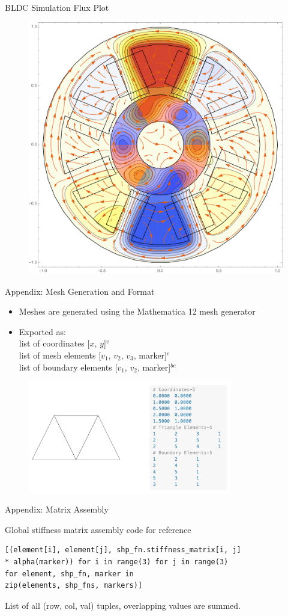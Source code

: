 \documentclass{beamer}
\begin{document}
    \begin{frame}{BLDC Simulation}
        Flux Plot
        \begin{figure}
            \includegraphics[width=.6\linewidth]{motor1.pdf}
        \end{figure}
    \end{frame}
    \begin{frame}{Appendix: Mesh Generation and Format}
        \begin{itemize}
            \item Meshes are generated using the Mathematica 12 mesh generator
            \item Exported as:\\ list of coordinates [$x$, $y$]$^v$ \\list of mesh elements [$v_1$, $v_2$, $v_3$, marker]$^{e}$ \\list of boundary elements [$v_1$, $v_2$, marker]$^{be}$
        \end{itemize}


        \begin{figure}
            \centering
            \includegraphics[width=3.5in]{meshdemo.png}
        \end{figure}
    \end{frame}
    \begin{frame}[fragile]{Appendix: Matrix Assembly}

        Global stiffness matrix assembly code for reference
        {\small
        \begin{verbatim}
[(element[i], element[j], shp_fn.stiffness_matrix[i, j]
* alpha(marker)) for i in range(3) for j in range(3)
for element, shp_fn, marker in
zip(elements, shp_fns, markers)]
        \end{verbatim}}
        List of all (row, col, val) tuples, overlapping values are summed.
    \end{frame}
\end{document}
